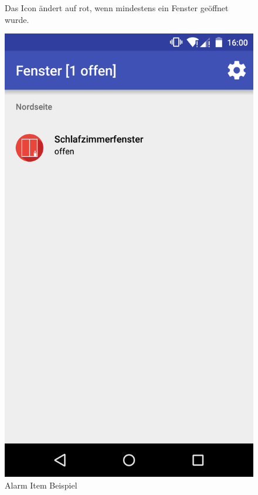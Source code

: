 \begin{figure}[htbp]
	\begin{minipage}{0.6\textwidth} 
Das Icon ändert auf rot, wenn mindestens ein Fenster geöffnet wurde.
	\end{minipage}
	\hfill
	\begin{minipage}{0.32\textwidth}
		\includegraphics[scale=0.12]{appendix/img/AppScreenshots/Screenshot6}
		\caption{Alarm Item Beispiel}
		\label{fig:screenshot_6}
	\end{minipage}
\end{figure}

